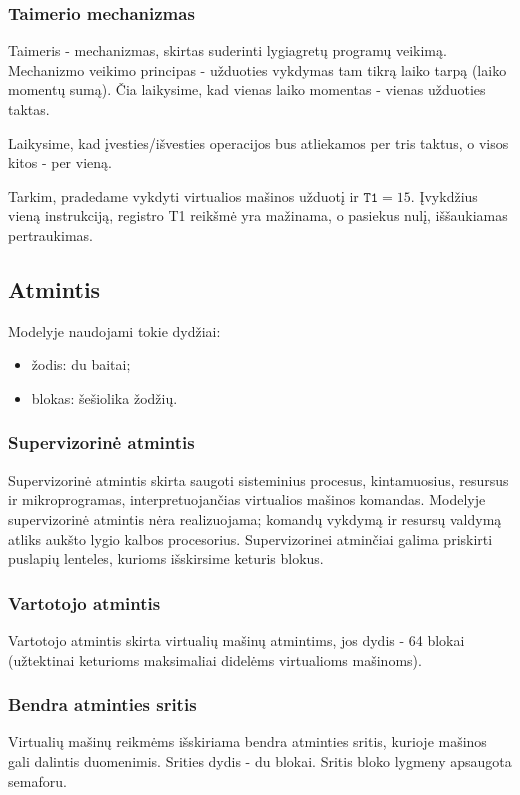 \documentclass{scrartcl}
\begin{document}
            \subsubsection{Taimerio mechanizmas}
                Taimeris - mechanizmas, skirtas suderinti lygiagretų programų veikimą. Mechanizmo veikimo principas - užduoties vykdymas tam tikrą laiko tarpą (laiko momentų sumą). Čia laikysime, kad vienas laiko momentas - vienas užduoties taktas.
                \par
                Laikysime, kad įvesties/išvesties operacijos bus atliekamos per tris taktus, o visos kitos - per vieną.
                \par
                Tarkim, pradedame vykdyti virtualios mašinos užduotį ir $\texttt{T1} = 15$. Įvykdžius vieną instrukciją, registro T1 reikšmė yra mažinama, o pasiekus nulį, iššaukiamas pertraukimas.
        \subsection{Atmintis}
            Modelyje naudojami tokie dydžiai:
            \begin{itemize}
                \item žodis: du baitai;
                \item blokas: šešiolika žodžių.
            \end{itemize}
            \subsubsection{Supervizorinė atmintis}
                Supervizorinė atmintis skirta saugoti sisteminius procesus, kintamuosius, resursus ir mikroprogramas, interpretuojančias virtualios mašinos komandas. Modelyje supervizorinė atmintis nėra realizuojama; komandų vykdymą ir resursų valdymą atliks aukšto lygio kalbos procesorius. Supervizorinei atminčiai galima priskirti puslapių lenteles, kurioms išskirsime keturis blokus.
            \subsubsection{Vartotojo atmintis}
                Vartotojo atmintis skirta virtualių mašinų atmintims, jos dydis - 64 blokai (užtektinai keturioms maksimaliai didelėms virtualioms mašinoms).
            \subsubsection{Bendra atminties sritis}
                Virtualių mašinų reikmėms išskiriama bendra atminties sritis, kurioje mašinos gali dalintis duomenimis. Srities dydis - du blokai. Sritis bloko lygmeny apsaugota semaforu.
\end{document}
